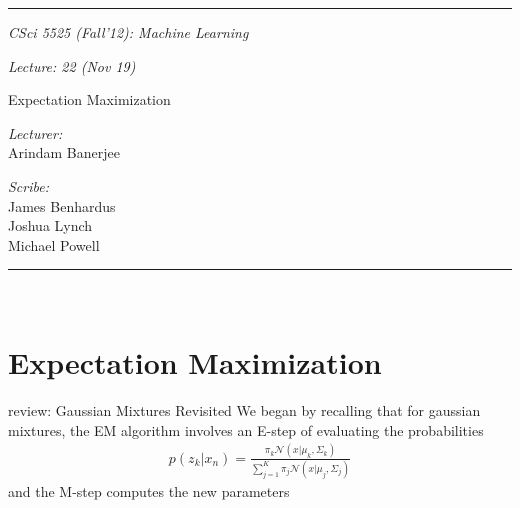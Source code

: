 \documentclass[11pt]{article}
\newcommand{\HRule}{\rule{\linewidth}{0.5mm}}
\begin{document}
\HRule
\begin{center}
\begin{minipage}{0.5\textwidth}
\begin{flushleft} \large
\emph{CSci 5525 (Fall'12): Machine Learning}
\end{flushleft}
\end{minipage}
\hspace*{13mm}
\begin{minipage}{0.4\textwidth}
\begin{flushright} \large
\emph{Lecture: 22 (Nov 19)}
\end{flushright}
\end{minipage}
\vspace*{5mm}

{\LARGE Expectation Maximization}\\
\vspace*{5mm}

\begin{minipage}{0.4\textwidth}
\begin{flushleft} \large
\emph{Lecturer:}\\ 
Arindam Banerjee
\end{flushleft}
\end{minipage}
\hspace*{25mm}
\begin{minipage}{0.4\textwidth}
\begin{flushright} \large
\emph{Scribe:} \\
James Benhardus\\
Joshua Lynch\\
Michael Powell
\end{flushright}
\end{minipage}

\end{center}
\HRule\\

\section{Expectation Maximization}

review: Gaussian Mixtures Revisited
We began by recalling that for gaussian mixtures, the EM algorithm involves an E-step of evaluating the probabilities 
\begin{align*}
p(z_{k}|x_{n}) = \frac{\pi_{k}\mathcal{N}(x|\mu_{k},\Sigma_{k})}{\sum_{j=1}^{K}\pi_{j}\mathcal{N}(x|\mu_{j},\Sigma_j)}
\end{align*}
and the M-step computes the new parameters 
\end{document}
